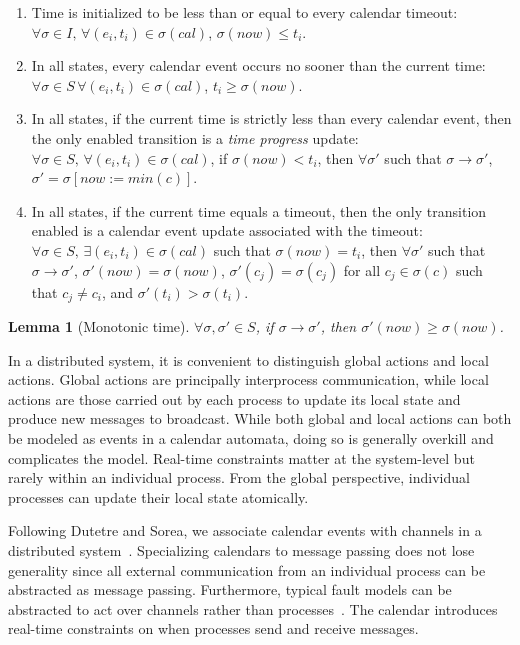 \documentclass{IEEEtran/IEEEtran}
\newtheorem{lemma}{Lemma}
\begin{document}
\begin{enumerate}
\item Time is initialized to be less than or equal to every calendar timeout: $\forall \sigma \in I, \, \forall (e_i, t_i) \in \sigma(cal)$, $\sigma(now) \leq t_i$.

\item In all states, every calendar event occurs no sooner than the current time: $\forall \sigma \in S \, \forall (e_i, t_i) \in \sigma(cal)$, $t_i \geq \sigma(now)$.

\item In all states, if the current time is strictly less than every calendar event, then the only enabled transition is a \emph{time progress} update: $\forall \sigma \in S, \, \forall (e_i, t_i) \in \sigma(cal)$, if $\sigma(now) < t_i$, then $\forall \sigma'$ such that $\sigma \rightarrow \sigma'$, $\sigma' = \sigma[now := min(c)]$.

\item In all states, if the current time equals a timeout, then the only transition enabled is a calendar event update associated with the timeout: $\forall \sigma \in S, \, \exists (e_i, t_i) \in \sigma(cal)$ such that $\sigma(now) = t_i$, then $\forall \sigma'$ such that $\sigma \rightarrow \sigma'$, $\sigma'(now) = \sigma(now)$, $\sigma'(c_j) = \sigma(c_j)$ for all $c_j \in \sigma(c)$ such that $c_j \neq c_i$, and $\sigma'(t_i) > \sigma(t_i)$.
\end{enumerate}

\begin{lemma}[Monotonic time]
$\forall \sigma, \sigma' \in S$, if $\sigma \rightarrow \sigma'$, then $\sigma'(now) \geq \sigma(now)$.
\end{lemma}

In a distributed system, it is convenient to distinguish global actions and local actions. Global actions are principally interprocess communication, while local actions are those carried out by each process to update its local state and produce new messages to broadcast. While both global and local actions can both be modeled as events in a calendar automata, doing so is generally overkill and complicates the model. Real-time constraints matter at the system-level but rarely within an individual process. From the global perspective, individual processes can update their local state atomically.

Following Dutetre and Sorea, we associate calendar events with channels in a distributed system~\cite{dutetre}. Specializing calendars to message passing does not lose generality since all external communication from an individual process can be abstracted as message passing. Furthermore, typical fault models can be abstracted to act over channels rather than processes~\cite{abstractions}. The calendar introduces real-time constraints on when processes send and receive messages.
\end{document}
